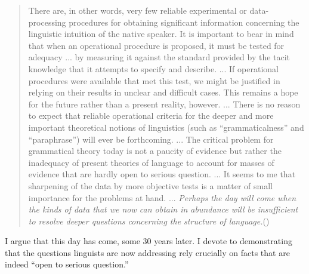 \begin{quote}
There are, in other words, very few reliable experimental or data-processing procedures for obtaining significant information concerning the linguistic intuition of the native speaker. It is important to bear in mind that when an operational procedure is proposed, it must be tested for adequacy ... by measuring it against the standard provided by the tacit knowledge that it attempts to specify and describe. ... If operational procedures were available that met this test, we might be justified in relying on their results in unclear and difficult cases. This remains a hope for the future rather than a present reality, however. ... There is no reason to expect that reliable operational criteria for the deeper and more important theoretical notions of linguistics (such as ``grammaticalness'' and ``paraphrase'') will ever be forthcoming. ... The critical problem for grammatical theory today is not a paucity of evidence but rather the inadequacy of present theories of language to account for masses of evidence that are hardly open to serious question. ... It seems to me that sharpening of the data by more objective tests is a matter of small importance for the problems at hand. ... \textit{Perhaps the day will come when the kinds of data that we now can obtain in abundance will be insufficient to resolve deeper questions concerning the structure of language.}(\citet[19--21]{Aspects})
\end{quote}

\noindent
I argue that this day has come, some 30 years later. I devote  to demonstrating that the questions linguists are now addressing rely crucially on facts that are indeed ``open to serious question.''


